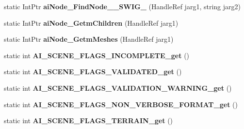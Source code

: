 \begin{DoxyCompactItemize}
\item 
\hypertarget{class_assimp_p_i_n_v_o_k_e_a27231f559e4b0bc90bf216acb2597a5f}{static Int\+Ptr {\bfseries ai\+Node\+\_\+\+Find\+Node\+\_\+\+\_\+\+S\+W\+I\+G\+\_} (Handle\+Ref jarg1, string jarg2)}\label{class_assimp_p_i_n_v_o_k_e_a27231f559e4b0bc90bf216acb2597a5f}

\item 
\hypertarget{class_assimp_p_i_n_v_o_k_e_a9e6f2797548a8f200f70103cfe6e92c9}{static Int\+Ptr {\bfseries ai\+Node\+\_\+\+Getm\+Children} (Handle\+Ref jarg1)}\label{class_assimp_p_i_n_v_o_k_e_a9e6f2797548a8f200f70103cfe6e92c9}

\item 
\hypertarget{class_assimp_p_i_n_v_o_k_e_a54b04025e14b57ed083838282ad1cc16}{static Int\+Ptr {\bfseries ai\+Node\+\_\+\+Getm\+Meshes} (Handle\+Ref jarg1)}\label{class_assimp_p_i_n_v_o_k_e_a54b04025e14b57ed083838282ad1cc16}

\item 
\hypertarget{class_assimp_p_i_n_v_o_k_e_a8bcefe18df50950335ea39808e895b3b}{static int {\bfseries A\+I\+\_\+\+S\+C\+E\+N\+E\+\_\+\+F\+L\+A\+G\+S\+\_\+\+I\+N\+C\+O\+M\+P\+L\+E\+T\+E\+\_\+get} ()}\label{class_assimp_p_i_n_v_o_k_e_a8bcefe18df50950335ea39808e895b3b}

\item 
\hypertarget{class_assimp_p_i_n_v_o_k_e_a911c3ed17ccd466a3649b1fed678a5a1}{static int {\bfseries A\+I\+\_\+\+S\+C\+E\+N\+E\+\_\+\+F\+L\+A\+G\+S\+\_\+\+V\+A\+L\+I\+D\+A\+T\+E\+D\+\_\+get} ()}\label{class_assimp_p_i_n_v_o_k_e_a911c3ed17ccd466a3649b1fed678a5a1}

\item 
\hypertarget{class_assimp_p_i_n_v_o_k_e_ad4b4539f022ea992a1473cf4ba9fceb1}{static int {\bfseries A\+I\+\_\+\+S\+C\+E\+N\+E\+\_\+\+F\+L\+A\+G\+S\+\_\+\+V\+A\+L\+I\+D\+A\+T\+I\+O\+N\+\_\+\+W\+A\+R\+N\+I\+N\+G\+\_\+get} ()}\label{class_assimp_p_i_n_v_o_k_e_ad4b4539f022ea992a1473cf4ba9fceb1}

\item 
\hypertarget{class_assimp_p_i_n_v_o_k_e_a4b2acf163dbe4499dc16b98146b46e32}{static int {\bfseries A\+I\+\_\+\+S\+C\+E\+N\+E\+\_\+\+F\+L\+A\+G\+S\+\_\+\+N\+O\+N\+\_\+\+V\+E\+R\+B\+O\+S\+E\+\_\+\+F\+O\+R\+M\+A\+T\+\_\+get} ()}\label{class_assimp_p_i_n_v_o_k_e_a4b2acf163dbe4499dc16b98146b46e32}

\item 
\hypertarget{class_assimp_p_i_n_v_o_k_e_a6af0f448181df405bc0ce2ef2834fc89}{static int {\bfseries A\+I\+\_\+\+S\+C\+E\+N\+E\+\_\+\+F\+L\+A\+G\+S\+\_\+\+T\+E\+R\+R\+A\+I\+N\+\_\+get} ()}\label{class_assimp_p_i_n_v_o_k_e_a6af0f448181df405bc0ce2ef2834fc89}


\end{DoxyCompactItemize}
